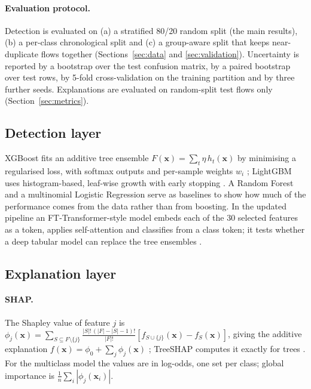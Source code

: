 \documentclass[11pt,a4paper]{article}
\begin{document}
\paragraph{Evaluation protocol.} Detection is evaluated on (a) a stratified 80/20 random split (the main results), (b) a per-class chronological split and (c) a group-aware split that keeps near-duplicate flows together (Sections~\ref{sec:data} and \ref{sec:validation}). Uncertainty is reported by a bootstrap over the test confusion matrix, by a paired bootstrap over test rows, by 5-fold cross-validation on the training partition and by three further seeds. Explanations are evaluated on random-split test flows only (Section~\ref{sec:metrics}).

\subsection{Detection layer}
XGBoost fits an additive tree ensemble $F(\mathbf{x})=\sum_t\eta\,h_t(\mathbf{x})$ by minimising a regularised loss, with softmax outputs and per-sample weights $w_i$ \parencite{chen2016}; LightGBM uses histogram-based, leaf-wise growth with early stopping \parencite{ke2017}. A Random Forest and a multinomial Logistic Regression serve as baselines to show how much of the performance comes from the data rather than from boosting. In the updated pipeline an FT-Transformer-style model \parencite{gorishniy2021} embeds each of the 30 selected features as a token, applies self-attention \parencite{vaswani2017} and classifies from a class token; it tests whether a deep tabular model can replace the tree ensembles \parencite{grinsztajn2022,shwartzziv2022}.

\subsection{Explanation layer}
\paragraph{SHAP.} The Shapley value of feature $j$ is $\phi_j(\mathbf{x})=\sum_{S\subseteq F\setminus\{j\}}\frac{|S|!\,(|F|-|S|-1)!}{|F|!}[f_{S\cup\{j\}}(\mathbf{x})-f_S(\mathbf{x})]$, giving the additive explanation $f(\mathbf{x})=\phi_0+\sum_j\phi_j(\mathbf{x})$ \parencite{lundberg2017}; TreeSHAP computes it exactly for trees \parencite{lundberg2020}. For the multiclass model the values are in log-odds, one set per class; global importance is $\frac1n\sum_i|\phi_j(\mathbf{x}_i)|$.
\end{document}
